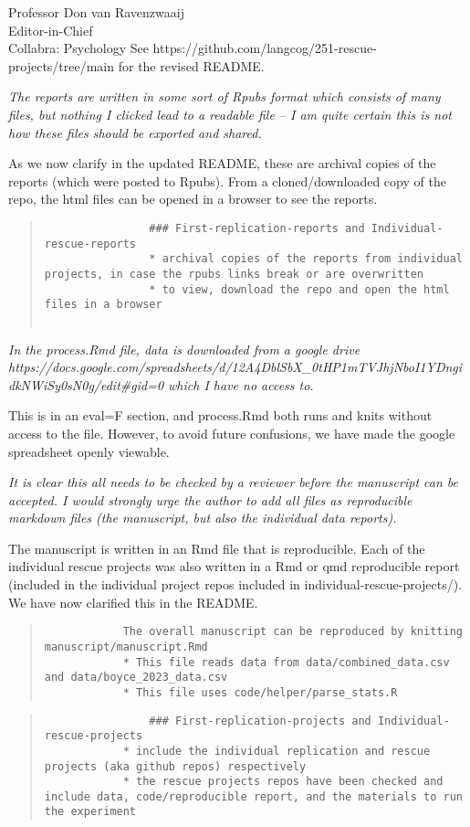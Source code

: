 \documentclass{stanfordletter}
\newcommand{\theysaid}[1]{\begin{leftbar} \noindent 
		\textsl{ #1}\end{leftbar}}
\newcommand{\revised}[1]{\begin{quote}	#1 \end{quote}}
\begin{document}
\begin{letter}{Professor Don van Ravenzwaaij \\ Editor-in-Chief \\ Collabra: Psychology }
		See  https://github.com/langcog/251-rescue-projects/tree/main for the revised README. 
		
		\theysaid{The reports are written in some sort of Rpubs format which consists of many files, but nothing I clicked lead to a readable file – I am quite certain this is not how these files should be exported and shared.}
		
		As we now clarify in the updated README, these are archival copies of the reports (which were posted to Rpubs). From a cloned/downloaded copy of the repo, the html files can be opened in a browser to see the reports.
		
		 \revised{\begin{verbatim}
		 		### First-replication-reports and Individual-rescue-reports
		 		* archival copies of the reports from individual projects, in case the rpubs links break or are overwritten
		 		* to view, download the repo and open the html files in a browser
		 		
		 	\end{verbatim}}
		
		\theysaid{In the process.Rmd file, data is downloaded from a google drive https://docs.google.com/spreadsheets/d/12A4DblSbX\_0tHP1mTVJhjNboI1YDngidkNWiSy0sN0g/edit\#gid=0 which I have no access to. }
		
		This is in an eval=F section, and process.Rmd both runs and knits without access to the file. However, to avoid future confusions, we have made the google spreadsheet openly viewable. 
		
		\theysaid{It is clear this all needs to be checked by a reviewer before the manuscript can be accepted. I would strongly urge the author to add all files as reproducible markdown files (the manuscript, but also the individual data reports).}
		
		The manuscript is written in an Rmd file that is reproducible. Each of the individual rescue projects was also written in a Rmd or qmd reproducible report (included in the individual project repos included in individual-rescue-projects/). We have now clarified this in the README. 
		
		\revised{ \begin{verbatim}
			The overall manuscript can be reproduced by knitting manuscript/manuscript.Rmd
			* This file reads data from data/combined_data.csv and data/boyce_2023_data.csv
			* This file uses code/helper/parse_stats.R \end{verbatim}}
			
		\revised{\begin{verbatim}
				### First-replication-projects and Individual-rescue-projects
			* include the individual replication and rescue projects (aka github repos) respectively
			* the rescue projects repos have been checked and include data, code/reproducible report, and the materials to run the experiment\end{verbatim}}
		

\end{letter}
\end{document}
